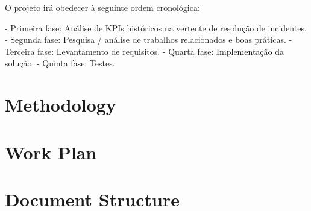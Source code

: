 O projeto irá obedecer à seguinte ordem cronológica:

 - Primeira fase: Análise de KPIs históricos na vertente de resolução de incidentes.
 - Segunda fase: Pesquisa / análise de trabalhos relacionados e boas práticas.
 - Terceira fase: Levantamento de requisitos.
 - Quarta fase: Implementação da solução.
 - Quinta fase: Testes.

\section{Methodology}

\section{Work Plan}

\section{Document Structure}

